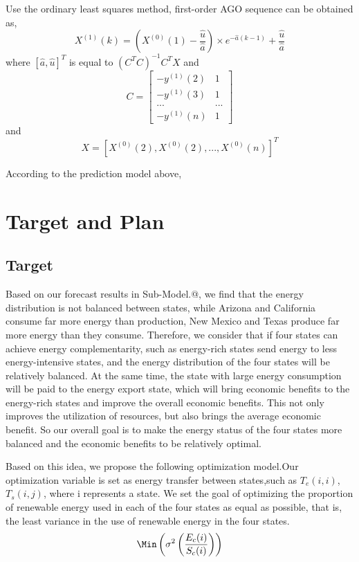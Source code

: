 \documentclass{mcmthesis}
\makeatletter
\newcommand{\Rmnum}[1]{\expandafter\@slowromancap\romannumeral #1@}
\makeatother
\begin{document}
Use the ordinary least squares method, first-order AGO sequence can be obtained as,
\begin{equation}
  X^{(1)}(k)=\left(X^{(0)}(1)-\frac{\hat{u}}{\hat{a}}\right)\times e^{-\hat{a}(k-1)}+\frac{\hat{u}}{\hat{a}}
\end{equation}
where $\left[\hat{a},\hat{u}\right]^T$ is equal to $\left(C^TC\right)^{-1}C^TX$
and
\begin{equation}
C=\begin{bmatrix}-y^{(1)}(2)&1\\-y^{(1)}(3)&1\\...&...\\-y^{(1)}(n)&1\end{bmatrix}
\end{equation}
and
\begin{equation}
  X = \left[X^{(0)}(2),X^{(0)}(2),...,X^{(0)}(n)\right]^T
\end{equation}

According to the prediction model above, 

\section{Target and Plan}
\subsection{Target}

Based on our forecast results in Sub-Model.\Rmnum{2}, we find that  the energy distribution is not balanced between states,  
while Arizona and California consume far more energy than production, New Mexico and Texas produce far more energy than they consume.
Therefore, we consider that if four states can achieve energy complementarity, such as energy-rich states send energy to less energy-intensive states, and the energy distribution of the four states will be relatively balanced.
At the same time, the state with large energy consumption will be paid to the energy export state, which will bring economic benefits to the energy-rich states and improve the overall economic benefits.
This not only improves the utilization of resources, but also brings the average economic benefit.
So our overall goal is to make the energy status of the four states more balanced and the economic benefits to be relatively optimal.

Based on this idea, we propose the following optimization model.Our optimization variable is set as energy transfer between states,such as $T_e(i,i)$, $T_s(i,j)$, where i represents a state.
We set the goal of optimizing the proportion of renewable energy used in each of the four states as equal as possible, that is, the least variance in the use of renewable energy in the four states.
\begin{equation}
  \Min\left({\sigma}^2\left(\frac{E_c(i)}{S_c(i)}\right)\right)
\end{equation}
\end{document}
